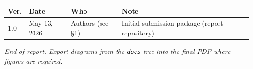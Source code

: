 \documentclass[11pt,a4paper]{article}
\begin{document}
\begin{center}
\begin{tabular}{@{}lllp{}@{}}
\toprule
\textbf{Ver.} & \textbf{Date} & \textbf{Who} & \textbf{Note} \\
\midrule
1.0 & May 13, 2026 & Authors (see \S1) & Initial submission package (report + repository). \\
\bottomrule
\end{tabular}
\end{center}

\vspace{2em}
\noindent\textit{End of report. Export diagrams from the \texttt{docs} tree into the final PDF where figures are required.}
\end{document}

